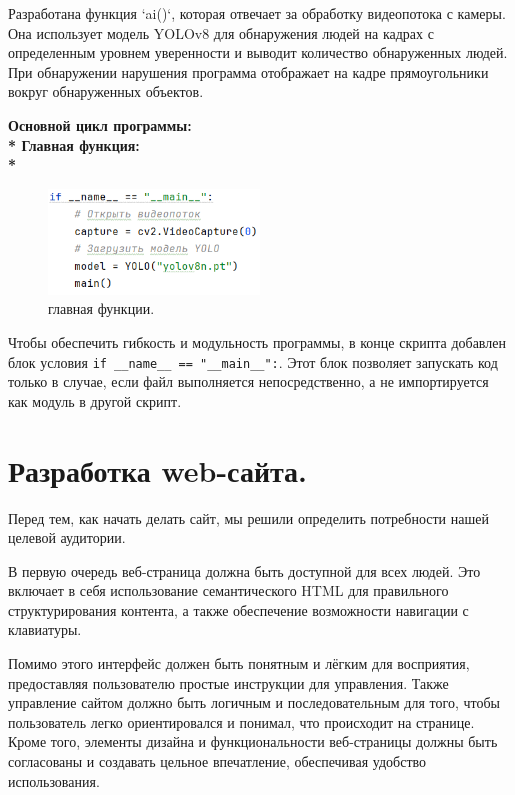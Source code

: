 Разработана функция `ai()`, которая отвечает за обработку видеопотока с камеры. Она использует модель YOLOv8 для обнаружения людей на кадрах с определенным уровнем уверенности и выводит количество обнаруженных людей. При обнаружении нарушения программа отображает на кадре прямоугольники вокруг обнаруженных объектов.

\bfseries
Основной цикл программы:\\*
\hspace*{11.5mm} Главная функция:\\*

\begin{figure}[!h]
	\centering
	\label{fig:img17}
	\includegraphics[width=0.5\textwidth]{./graphics/img/image17.png}
	\caption{главная функции.}
\end{figure}

\mdseries
Чтобы обеспечить гибкость и модульность программы, в конце скрипта добавлен блок условия \verb|if __name__ == "__main__":|. Этот блок позволяет запускать код только в случае, если файл выполняется непосредственно, а не импортируется как модуль в другой скрипт.

\chapter{Разработка web-сайта.}

Перед тем, как начать делать сайт, мы решили определить потребности нашей целевой аудитории.

В первую очередь веб-страница должна быть доступной для всех людей. Это включает в себя использование семантического HTML для правильного структурирования контента, а также обеспечение возможности навигации с клавиатуры. 

Помимо этого интерфейс должен быть понятным и лёгким для восприятия, предоставляя пользователю простые инструкции для управления. Также управление сайтом должно быть логичным и последовательным для того, чтобы пользователь легко ориентировался и понимал, что происходит на странице. Кроме того, элементы дизайна и функциональности веб-страницы должны быть согласованы и создавать цельное впечатление, обеспечивая удобство использования.

